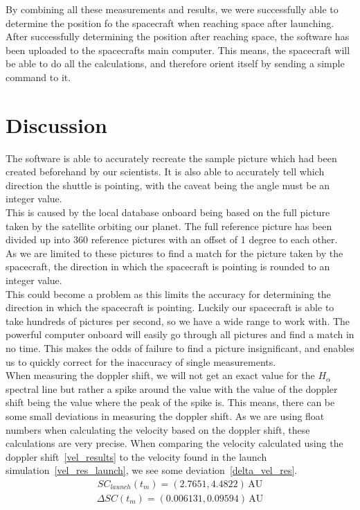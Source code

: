 \documentclass[reprint,english,notitlepage]{revtex4-2}
\begin{document}
By combining all these measurements and results, we were successfully able to determine the position fo the spacecraft when reaching space after launching.\\
After successfully determining the position after reaching space, the software has been uploaded to the spacecrafts main computer.
This means, the spacecraft will be able to do all the calculations, and therefore orient itself by sending a simple command to it.

\section{Discussion} \label{sec:discussion}
The software is able to accurately recreate the sample picture which had been created beforehand by our scientists.
It is also able to accurately tell which direction the shuttle is pointing, with the caveat being the angle must be an integer value.\\
This is caused by the local database onboard being based on the full picture taken by the satellite orbiting our planet.
The full reference picture has been divided up into 360 reference pictures with an offset of 1 degree to each other.\\
As we are limited to these pictures to find a match for the picture taken by the spacecraft, the direction in which the spacecraft is pointing is rounded to an integer value.\\
This could become a problem as this limits the accuracy for determining the direction in which the spacecraft is pointing.
Luckily our spacecraft is able to take hundreds of pictures per second, so we have a wide range to work with.
The powerful computer onboard will easily go through all pictures and find a match in no time.
This makes the odds of failure to find a picture insignificant, and enables us to quickly correct for the inaccuracy of single measurements.\\

When measuring the doppler shift, we will not get an exact value for the $H_{\alpha}$ spectral line but rather a spike around the value with the value of the doppler shift being the value where the peak of the spike is.
This means, there can be some small deviations in measuring the doppler shift.
As we are using float numbers when calculating the velocity based on the doppler shift, these calculations are very precise.
When comparing the velocity calculated using the doppler shift~\eqref{vel_results} to the velocity found in the launch simulation~\eqref{vel_res_launch}, we see some deviation~\eqref{delta_vel_res}.
\begin{align}
SC_{launch}(t_m) = (2.7651, 4.4822) \,\text{AU} \label{vel_res_launch}
\end{align}
\begin{align}
\Delta SC(t_m) = (0.006131, 0.09594) \,\text{AU} \label{delta_vel_res}
\end{align}
\end{document}
